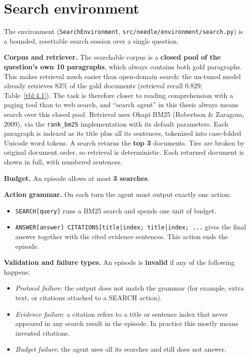 \section{Search environment}\label{sec:3.3}

The environment (\texttt{SearchEnvironment},
\texttt{src/\allowbreak{}needle/\allowbreak{}environment/\allowbreak{}search.\allowbreak{}py})
is a bounded, resettable search session over a single question.

\textbf{Corpus and retriever.} The searchable corpus is a \textbf{closed
pool of the question's own 10 paragraphs}, which always contains both
gold paragraphs. This makes retrieval much easier than open-domain
search: the un-tuned model already retrieves 83\% of the gold documents
(retrieval recall 0.829, Table~\ref{tbl:4.1}). The task is therefore
closer to reading comprehension with a paging tool than to web search,
and ``search agent'' in this thesis always means search over this closed
pool. Retrieval uses Okapi BM25 (Robertson \& Zaragoza, 2009), via the
\texttt{rank\_\allowbreak{}bm25} implementation with its default
parameters. Each paragraph is indexed as its title plus all its
sentences, tokenized into case-folded Unicode word tokens. A search
returns the \textbf{top 3} documents. Ties are broken by original
document order, so retrieval is deterministic. Each returned document is
shown in full, with numbered sentences.

\textbf{Budget.} An episode allows at most \textbf{3 searches}.

\textbf{Action grammar.} On each turn the agent must output exactly one
action:

\begin{itemize}
\tightlist
\item
  \texttt{SEARCH{[}\allowbreak{}query{]}} runs a BM25 search and spends
  one unit of budget.
\item
  \texttt{ANSWER{[}\allowbreak{}answer{]} CITATIONS{[}\allowbreak{}title|index; title|index; .\allowbreak{}.\allowbreak{}.\allowbreak{}{]}}
  gives the final answer together with the cited evidence sentences.
  This action ends the episode.
\end{itemize}

\textbf{Validation and failure types.} An episode is \textbf{invalid} if
any of the following happens:

\begin{itemize}
\tightlist
\item
  \emph{Protocol failure}: the output does not match the grammar (for
  example, extra text, or citations attached to a SEARCH action).
\item
  \emph{Evidence failure}: a citation refers to a title or sentence
  index that never appeared in any search result in the episode. In
  practice this mostly means invented citations.
\item
  \emph{Budget failure}: the agent uses all its searches and still does
  not answer.
\end{itemize}


